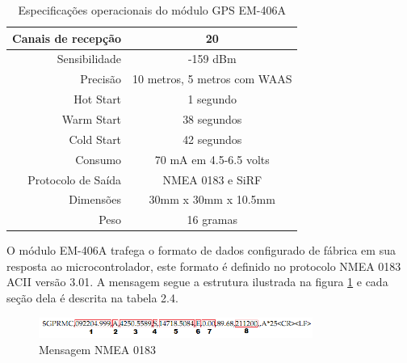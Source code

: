 \begin{table}[!h]
  \caption{Especificações operacionais do módulo GPS EM-406A}
	\centering
	\begin{tabular}{|r|c|}
		\hline
			Canais de recepção & 20
		\\
		\hline
			Sensibilidade & -159 dBm
		\\
		\hline
			Precisão & 10 metros, 5 metros com WAAS
		\\
		\hline
		  Hot Start & 1 segundo
		\\
		\hline
			Warm Start & 38 segundos
		\\
		\hline
			Cold Start & 42 segundos
		\\
		\hline
			Consumo & 70 mA em 4.5-6.5 volts
		\\
		\hline
			Protocolo de Saída & NMEA 0183 e SiRF
		\\
		\hline
			Dimensões & 30mm x 30mm x 10.5mm
		\\
		\hline
		  Peso & 16 gramas
		\\
\hline
\end{tabular}
\end{table}

\newpage
O módulo EM-406A trafega o formato de dados configurado de fábrica em sua resposta ao microcontrolador, este formato é definido no protocolo NMEA 0183 ACII versão 3.01. A mensagem segue a estrutura ilustrada na figura \ref{fig:gprmc} e cada seção dela é descrita na tabela 2.4.

\begin{figure}[h!]
			\centering
			\includegraphics[width=0.8\textwidth]{figures/gprmc.png}
			\caption{Mensagem NMEA 0183}
			\label{fig:gprmc}
\end{figure}

